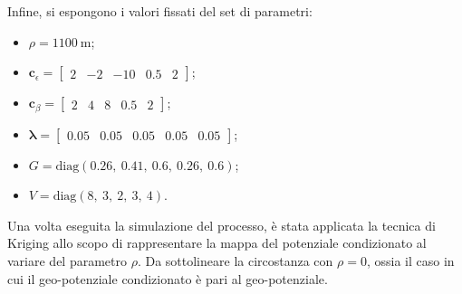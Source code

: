 Infine, si espongono i valori fissati del set di parametri:
\begin{itemize}
	\item $\rho = \SI{1100}{\meter}$;
	\item $\mathbf{c}_\epsilon = \begin{bmatrix} 2 & -2 & -10 & 0.5 & 2 \end{bmatrix}$;
	\item $\mathbf{c}_\beta = \begin{bmatrix} 2 & 4 & 8 & 0.5 & 2 \end{bmatrix}$;
	\item $\boldsymbol{\lambda} = \begin{bmatrix} 0.05 & 0.05  & 0.05 & 0.05  & 0.05  \end{bmatrix}$;
	\item $G = \text{diag}(0.26,\ 0.41,\ 0.6,\ 0.26,\ 0.6)$;
	\item $V = \text{diag}(8,\ 3,\ 2,\ 3,\ 4)$.
\end{itemize}
Una volta eseguita la simulazione del processo, è stata applicata la tecnica di Kriging allo scopo di rappresentare la mappa del potenziale condizionato al variare del parametro $\rho$. Da sottolineare la circostanza con $\rho = 0$, ossia il caso in cui il geo-potenziale condizionato è pari al geo-potenziale.

